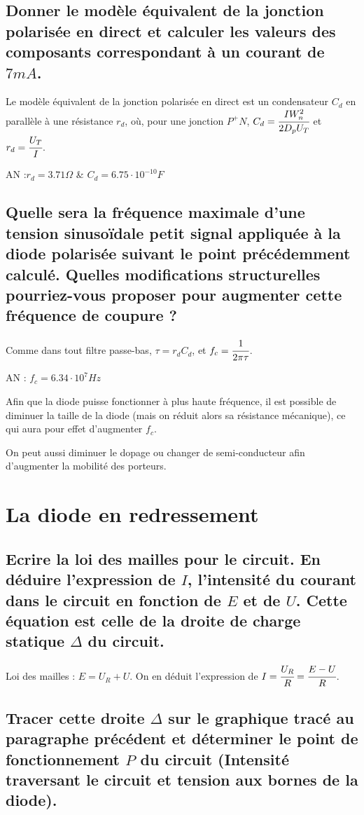 \documentclass[10pt]{article}
\begin{document}
  \subsection{Donner le modèle équivalent de la jonction polarisée en direct et calculer les valeurs des composants correspondant à un courant de $7 mA$.}
  Le modèle équivalent de la jonction polarisée en direct est un condensateur $C_d$ en parallèle à une résistance $r_d$, où, pour une jonction $P^+N$, $C_d = \cfrac{I W_n^2}{2 D_p U_T}$ et $r_d = \cfrac{U_T}{I}$.

  AN :$r_d = 3.71 \Omega$ \& $C_d = 6.75\cdot 10^{-10}F$
  
  \subsection{Quelle sera la fréquence maximale d’une tension sinusoïdale petit signal appliquée à la diode polarisée suivant le point précédemment calculé. Quelles modifications structurelles pourriez-vous proposer pour augmenter cette fréquence de coupure ?}
  Comme dans tout filtre passe-bas, $\tau = r_d C_d$, et $f_c = \cfrac{1}{2\pi\tau}$.

  AN : $f_c = 6.34\cdot 10^7Hz$

  Afin que la diode puisse fonctionner à plus haute fréquence, il est possible de diminuer la taille de la diode (mais on réduit alors sa résistance mécanique), ce qui aura pour effet d'augmenter $f_c$.

  On peut aussi diminuer le dopage ou changer de semi-conducteur afin d'augmenter la mobilité des porteurs.

 \section{La diode en redressement}
  \subsection{Ecrire la loi des mailles pour le circuit. En déduire l’expression de $I$, l’intensité du courant dans le circuit en fonction de $E$ et de $U$. Cette équation est celle de la droite de charge statique $\Delta$ du circuit.}
   Loi des mailles : $E = U_R + U$. On en déduit l'expression de $I = \cfrac{U_R}{R} = \cfrac{E-U}{R}$.

  \subsection{Tracer cette droite $\Delta$ sur le graphique tracé au paragraphe précédent et déterminer le point de fonctionnement $P$ du circuit (Intensité traversant le circuit et tension aux bornes de la diode).}
\end{document}
